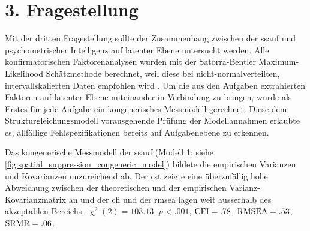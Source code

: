 \documentclass[11pt, twoside, a4paper]{book}		%
\begin{document}
















\clearpage
\section{3. Fragestellung \label{sec:3Fragestellung}}

Mit der dritten Fragestellung sollte der Zusammenhang zwischen der \gls{ssauf} und psychometrischer Intelligenz auf latenter Ebene untersucht werden. 
Alle konfirmatorischen Faktorenanalysen wurden mit der Satorra-Bentler Maximum-Likelihood Schätzmethode \citep{Satorra1994} berechnet, weil diese bei nicht-normal\-ver\-teilten, intervallskalierten Daten empfohlen wird \citep[z.B.][]{Curran1996, Finney2006}.
Um die aus den Aufgaben extrahierten Faktoren auf latenter Ebene miteinander in Verbindung zu bringen, wurde als Erstes für jede Aufgabe ein kongenerisches Messmodell \citep{Joereskog1971} gerechnet. Diese dem Strukturgleichungsmodell vorausgehende Prüfung der Modellannahmen erlaubte es, allfällige Fehlspezifikationen bereits auf Aufgabenebene zu erkennen.

Das kongenerische Messmodell der \gls{ssauf} (Modell 1; siehe \autoref{fig:spatial_suppression_congeneric_model}) bildete die empirischen Varianzen und Kovarianzen unzureichend ab.  Der \gls{cst} zeigte eine überzufällig hohe Abweichung zwischen der theoretischen und der empirischen Var\-ianz-Ko\-var\-ianz\-ma\-trix an und der \gls{cfi} und der \gls{rmsea} lagen weit ausserhalb des akzeptablen Bereichs, $\upchi^2(2)=103.13$, $p<.001$, $\textnormal{CFI}=.78$, $\textnormal{RMSEA}=.53$, $\textnormal{SRMR}=.06$.
\end{document}
